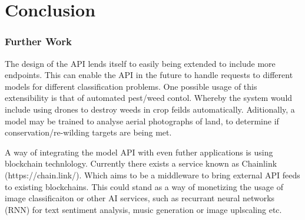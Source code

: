 \chapter{Conclusion}
\label{conclusion}
  \subsection{Further Work}
    The design of the API lends itself to easily being extended to include more endpoints. This can enable the API in the future to handle requests to different models for different classification problems. One possible usage of this extensibility is that of automated pest/weed contol. Whereby the system would include using drones to destroy weeds in crop feilds automatically. Aditionally, a model may be trained to analyse aerial photographs of land, to determine if conservation/re-wilding targets are being met.
    \par
    A way of integrating the model API with even futher applications is using blockchain technlology. Currently there exists a service known as Chainlink (https://chain.link/). Which aims to be a middleware to bring external API feeds to existing blockchains. This could stand as a way of monetizing the usage of image classificaiton or other AI services, such as recurrant neural networks (RNN) for text sentiment analysis, music generation or image uplscaling etc.
